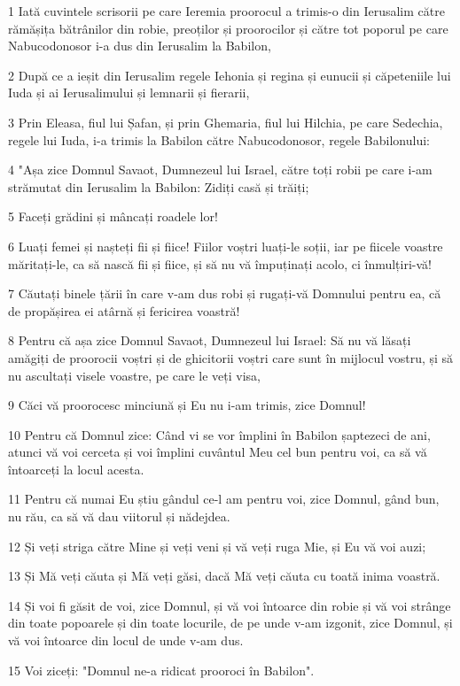 \par 1 Iată cuvintele scrisorii pe care Ieremia proorocul a trimis-o din Ierusalim către rămășița bătrânilor din robie, preoților și proorocilor și către tot poporul pe care Nabucodonosor i-a dus din Ierusalim la Babilon,
\par 2 După ce a ieșit din Ierusalim regele Iehonia și regina și eunucii și căpeteniile lui Iuda și ai Ierusalimului și lemnarii și fierarii,
\par 3 Prin Eleasa, fiul lui Șafan, și prin Ghemaria, fiul lui Hilchia, pe care Sedechia, regele lui Iuda, i-a trimis la Babilon către Nabucodonosor, regele Babilonului:
\par 4 "Așa zice Domnul Savaot, Dumnezeul lui Israel, către toți robii pe care i-am strămutat din Ierusalim la Babilon: Zidiți casă și trăiți;
\par 5 Faceți grădini și mâncați roadele lor!
\par 6 Luați femei și nașteți fii și fiice! Fiilor voștri luați-le soții, iar pe fiicele voastre măritați-le, ca să nască fii și fiice, și să nu vă împuținați acolo, ci înmulțiri-vă!
\par 7 Căutați binele țării în care v-am dus robi și rugați-vă Domnului pentru ea, că de propășirea ei atârnă și fericirea voastră!
\par 8 Pentru că așa zice Domnul Savaot, Dumnezeul lui Israel: Să nu vă lăsați amăgiți de proorocii voștri și de ghicitorii voștri care sunt în mijlocul vostru, și să nu ascultați visele voastre, pe care le veți visa,
\par 9 Căci vă proorocesc minciună și Eu nu i-am trimis, zice Domnul!
\par 10 Pentru că Domnul zice: Când vi se vor împlini în Babilon șaptezeci de ani, atunci vă voi cerceta și voi împlini cuvântul Meu cel bun pentru voi, ca să vă întoarceți la locul acesta.
\par 11 Pentru că numai Eu știu gândul ce-l am pentru voi, zice Domnul, gând bun, nu rău, ca să vă dau viitorul și nădejdea.
\par 12 Și veți striga către Mine și veți veni și vă veți ruga Mie, și Eu vă voi auzi;
\par 13 Și Mă veți căuta și Mă veți găsi, dacă Mă veți căuta cu toată inima voastră.
\par 14 Și voi fi găsit de voi, zice Domnul, și vă voi întoarce din robie și vă voi strânge din toate popoarele și din toate locurile, de pe unde v-am izgonit, zice Domnul, și vă voi întoarce din locul de unde v-am dus.
\par 15 Voi ziceți: "Domnul ne-a ridicat prooroci în Babilon".
